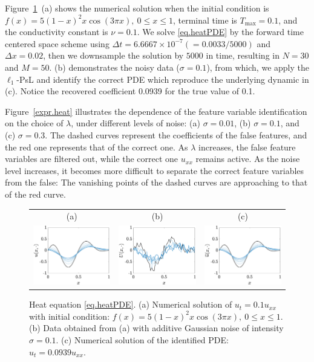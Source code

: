 \documentclass[a4paper,11pt]{article}
\theoremstyle{definition}
\begin{document}
Figure~\ref{fig.heat}~(a) shows the numerical solution when the initial condition is $f(x)=5(1-x)^2x\cos(3\pi x),~0\leq x\leq 1$, terminal time is $T_{\max}=0.1$, and the conductivity constant is $\nu =0.1$.   We solve \eqref{eq.heatPDE} by the forward time centered space scheme using $\Delta t=6.6667\times10^{-7} (=0.0033/5000)$ and $\Delta x= 0.02$, then we downsample the solution by $5000$ in time, resulting in $N=30$ and $M=50$. (b) demonstrates the noisy data ($\sigma=0.1$), from which, we apply the $\ell_1$-PsL and identify the correct PDE which reproduce the underlying dynamic in (c). Notice the recovered coefficient 0.0939 for the true value of 0.1.

Figure~\ref{expr.heat} illustrates the dependence of the feature variable identification on the choice of $\lambda$, under different levels of noise: (a) $\sigma=0.01$, (b) $\sigma=0.1$, and (c) $\sigma=0.3$. The dashed curves represent  the coefficients of the false features, and the red one represents that of the correct one.  As $\lambda$ increases, the false feature variables are filtered out, while the correct one $u_{xx}$ remains active. As the noise level increases, it becomes more difficult to separate the correct feature variables from the false: The vanishing points of the dashed curves are approaching to that of the red curve.
\begin{figure}
\centering
\begin{tabular}{ccc}
(a)&(b)&(c)\\
\includegraphics[width=2in]{Figures/heat_sol.eps}&
\includegraphics[width=2in]{Figures/heat_noise.eps}&
\includegraphics[width=2in]{Figures/heat_resimu.eps}
\end{tabular}
\caption{Heat equation \eqref{eq.heatPDE}. (a) Numerical solution of $u_t=0.1u_{xx}$ with initial condition: $f(x)=5(1-x)^2x\cos(3\pi x),~0\leq x\leq 1$. (b) Data obtained from (a) with additive Gaussian noise of intensity $\sigma=0.1$. (c) Numerical solution of the identified PDE: $u_t=0.0939u_{xx}$. }	\label{fig.heat}
\end{figure}
\end{document}
